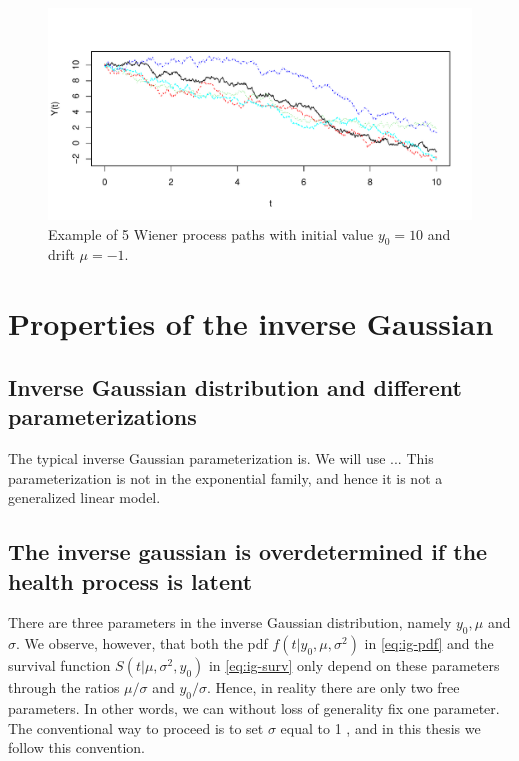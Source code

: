 \begin{figure}
\label{plot:wiener}
\caption{Example of 5 Wiener process paths with initial value $y_0=10$ and drift $\mu=-1$.}
\centering
\includegraphics[scale=0.4]{figures/wiener_processes.pdf}
\end{figure}

\section{Properties of the inverse Gaussian}

\subsection{Inverse Gaussian distribution and different parameterizations}
The typical inverse Gaussian parameterization is.
We will use ...
This parameterization is not in the exponential family, and hence it is not a generalized linear model.

\subsection{The inverse gaussian is overdetermined if the health process is latent}
There are three parameters in the inverse Gaussian distribution, namely $y_0, \mu$ and $\sigma$.
We observe, however, that both the pdf $f(t|y_0,\mu,\sigma^2)$ in \eqref{eq:ig-pdf} and the survival function $S(t|\mu,\sigma^2,y_0)$ in \eqref{eq:ig-surv} only depend on these parameters through the ratios $\mu/\sigma$ and $y_0/\sigma$.
Hence, in reality there are only two free parameters.
In other words, we can without loss of generality fix one parameter.
The conventional way to proceed is to set $\sigma$ equal to 1 \citep{leewhitmore2006}, and in this thesis we follow this convention.

